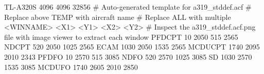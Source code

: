 TL-A320S 4096 4096 32856
# Auto-generated template for a319_stddef.acf
# Replace above TEMP with aircraft name
# Replace ALL with multiple <WINNAME> <X1> <Y1> <X2> <Y2>
# Inspect the a319_stddef.acf.png file with image viewer to extract each window
PFDCPT            10     2050   515  	2565
NDCPT		 520	 2050	1025	2565
ECAM		1030	 2050	1535	2565
MCDUCPT		1740	 2095	2010	2343
PFDFO		  10	 2570	515	3085
NDFO		 520	 2570   1025    3085
SD              1030     2570   1535    3085
MCDUFO          1740     2605	2010    2850